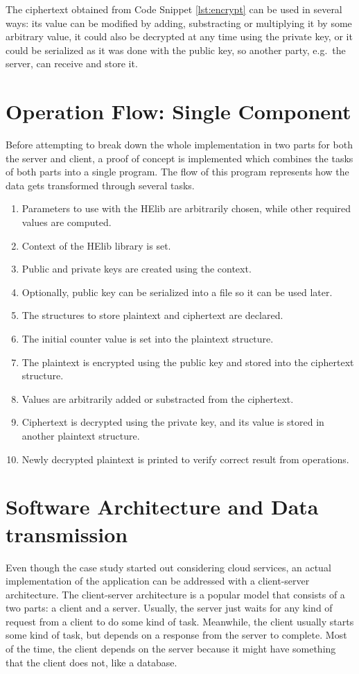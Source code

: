 The ciphertext obtained from Code Snippet \ref{lst:encrypt} can be used in several ways: its value can be modified by adding, substracting or multiplying it by some arbitrary value, it could also be decrypted at any time using the private key, or it could be serialized as it was done with the public key, so another party, e.g.\ the server, can receive and store it.

\section{{Operation Flow: Single Component}}

Before attempting to break down the whole implementation in two parts for both the server and client, a proof of concept is implemented which combines the tasks of both parts into a single program. The flow of this program represents how the data gets transformed through several tasks. 

\begin{enumerate}
	\item Parameters to use with the HElib are arbitrarily chosen, while other required values are computed.
	\item Context of the HElib library is set.	
	\item Public and private keys are created using the context.
	\item Optionally, public key can be serialized into a file so it can be used later.
	\item The structures to store plaintext and ciphertext are declared.
	\item The initial counter value is set into the plaintext structure.
	\item The plaintext is encrypted using the public key and stored into the ciphertext structure.
	\item Values are arbitrarily added or substracted from the ciphertext.
	\item Ciphertext is decrypted using the private key, and its value is stored in another plaintext structure.
	\item Newly decrypted plaintext is printed to verify correct result from operations.
\end{enumerate}

\section{{Software Architecture and Data transmission}}

Even though the case study started out considering cloud services, an actual implementation of the application can be addressed with a client-server architecture. The client-server architecture is a popular model that consists of a two parts: a client and a server. Usually, the server just waits for any kind of request from a client to do some kind of task. Meanwhile, the client usually starts some kind of task, but depends on a response from the server to complete. Most of the time, the client depends on the server because it might have something that the client does not, like a database.

